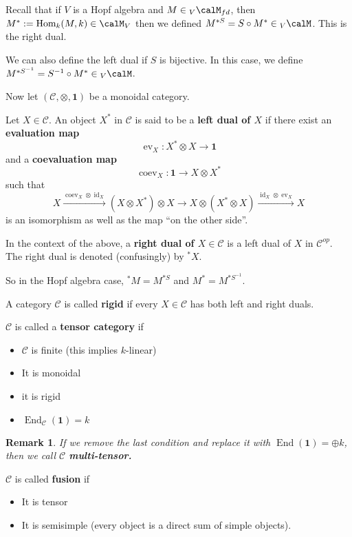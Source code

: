 \documentclass[12pt]{article}
\theoremstyle{break}
\theoremstyle{nonumberbreak}
\theoremstyle{changebreak}
\theoremstyle{break}
\theoremstyle{nonumberbreak}
\theoremstyle{nonumberplain}
\theoremstyle{change}
\newtheorem{rmk}[thm]{Remark}
\DeclareMathOperator{\id}{id}
\DeclareMathOperator{\End}{End}
\newcommand*{\Hom}{\ensuremath\text{Hom}}
\let\tilde\relax
\newcommand*{\tilde}[1]{\widetilde{#1}}
\begin{document}
Recall that if $V$ is a Hopf algebra and $M\in {_V\calM_{fd}}$, then $M^*:=\Hom_k(M,k)\in\calM_V$
then we defined $M^{*S}=\tilde S\circ M^*\in {_V\calM}$. This is the right dual.

We can also define the left dual if $S$ is bijective. In this case, we define $M^{*S^{-1}}=\tilde S^{-1}\circ M^*\in{_V\calM}$.

Now let $(\mathscr C,\otimes, \mathbf{1})$ be a monoidal category.
\begin{defn}
	Let $X\in\mathscr C$. An object $X^*$ in $\mathscr C$ is said to be a \textbf{left dual of $X$}
	if there exist an \textbf{evaluation map}
	\[\operatorname{ev}_X:X^*\otimes X\to \mathbf{1}\]
	and a \textbf{coevaluation map}
	\[\operatorname{coev}_X:\mathbf{1}\to X\otimes X^*\]
	such that
	\[X\xrightarrow{\operatorname{coev}_X\otimes\id_X}(X\otimes X^*)\otimes X\to X\otimes (X^*\otimes X)\xrightarrow{\id_X\otimes \operatorname{ev}_X} X\]
	is an isomorphism as well as the map ``on the other side''.
\end{defn}
\begin{defn}
	In the context of the above, a \textbf{right dual of $X\in\mathscr C$} is a left dual of $X$ in $\mathscr C^{op}$.
	The right dual is denoted (confusingly) by ${^*X}$.
\end{defn}
So in the Hopf algebra case, ${^*M}=M^{*S}$ and $M^*=M^{*S^{-1}}.$
\begin{defn}
	A category $\mathscr C$ is called \textbf{rigid} if every $X\in\mathscr C$ has both left and right duals.
\end{defn}
\begin{defn}
	$\mathscr C$ is called a \textbf{tensor category} if 
	\begin{itemize}
		\item $\mathscr C$ is finite (this implies $k$-linear)
		\item It is monoidal
		\item it is rigid
		\item $\End_\mathscr{C}(\mathbf{1})=k$
	\end{itemize}
\end{defn}
\begin{rmk}
	If we remove the last condition and replace it with $\End(\mathbf{1})=\oplus k$, then
	we call $\mathscr C$ \textbf{multi-tensor.}
\end{rmk}
\begin{defn}
	$\mathscr C$ is called \textbf{fusion} if 
	\begin{itemize}
		\item It is tensor
		\item It is semisimple (every object is a direct sum of simple objects).
	\end{itemize}
\end{defn}
\end{document}
